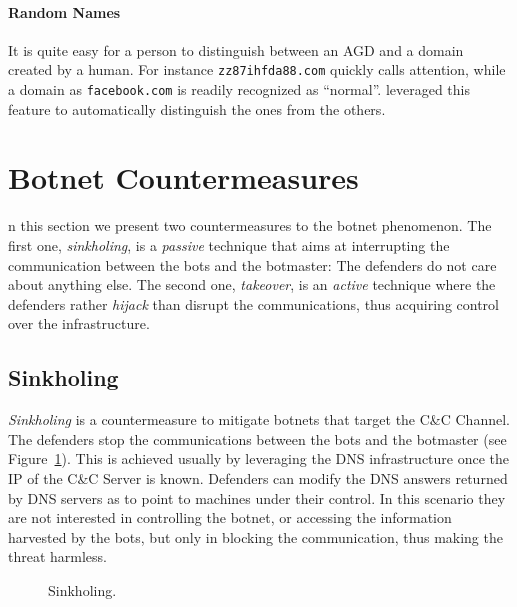 \paragraph{Random Names} It is quite easy for a person to distinguish between an
AGD and a domain created by a human. For instance \texttt{zz87ihfda88.com}
quickly calls attention, while a domain as \texttt{facebook.com} is readily recognized
as ``normal''. \citet{schiavoni2013} leveraged this feature to automatically
distinguish the ones from the others.


\section{Botnet Countermeasures} %
\label{sec:botnet_countermeasures}
n this section we present two countermeasures to the botnet
phenomenon. The first one, \emph{sinkholing}, is a \emph{passive} technique that
aims at interrupting the communication between the bots and the botmaster: The
defenders do not care about anything else. The second one, \emph{takeover}, is
an \emph{active} technique where the defenders rather \emph{hijack} than disrupt
the communications, thus acquiring control over the infrastructure.

\subsection{Sinkholing} %
\label{sub:sinkholing}
\emph{Sinkholing} is a countermeasure to mitigate botnets that target the
C\&C Channel. The defenders stop the communications between the bots and the
botmaster (see Figure~\ref{fig:sinkholing}). This is achieved usually by leveraging
the DNS infrastructure once the IP of the C\&C Server is known. Defenders can
modify the DNS answers returned by DNS servers as to point to machines under
their control. In this scenario they are not interested in controlling the
botnet, or accessing the information harvested by the bots, but only in
blocking the communication, thus making the threat harmless.

\begin{figure}[!htp]
\centering
{}
\caption{Sinkholing.}
\label{fig:sinkholing}
\end{figure}

